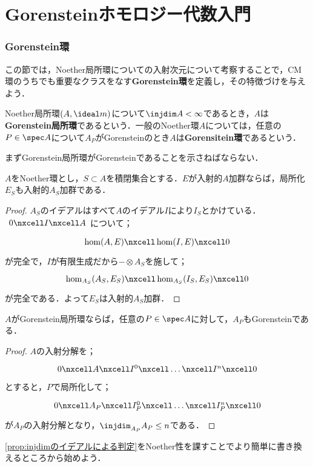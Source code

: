 \part[Introduction of Gorenstein Homological Algebra]{Gorensteinホモロジー代数入門}

\section{Gorenstein環}

この節では，Noether局所環についての入射次元について考察することで，CM環のうちでも重要なクラスをなす\textbf{Gorenstein環}を定義し，その特徴づけを与えよう．

\begin{defi}[Gorenstein環]
	Noether局所環$(A,\ideal m)$について$\injdim A<\infty$であるとき，$A$は\textbf{Gorenstein局所環}であるという．一般のNoether環$A$については，任意の$P\in\spec A$について$A_P$がGorensteinのとき$A$は\textbf{Gorensitein環}であるという．
\end{defi}

まずGorenstein局所環がGorensteinであることを示さねばならない．

\begin{lem}\label{lem:Noetherなら入射の局所化は入射}
	$A$をNoether環とし，$S\subset A$を積閉集合とする．$E$が入射的$A$加群ならば，局所化$E_S$も入射的$A_S$加群である．
\end{lem}

\begin{proof}
	$A_S$のイデアルはすべて$A$のイデアル$I$により$I_S$とかけている．$\begin{tikzcd}
	0\nxcell I\nxcell A
	\end{tikzcd}$について；
	\[\begin{tikzcd}
	\hom(A,E)\nxcell\hom(I,E)\nxcell0
	\end{tikzcd}\]
	が完全で，$I$が有限生成だから$-\otimes A_S$を施して；
	\[\begin{tikzcd}
	\hom_{A_S}(A_S,E_S)\nxcell\hom_{A_S}(I_S,E_S)\nxcell0
	\end{tikzcd}\]
	が完全である．よって$E_S$は入射的$A_S$加群．
\end{proof}

\begin{prop}
	$A$がGorenstein局所環ならば，任意の$P\in\spec A$に対して，$A_P$もGorensteinである．
\end{prop}

\begin{proof}
	$A$の入射分解を；
	\[\begin{tikzcd}
	0\nxcell A\nxcell I^0\nxcell\dots\nxcell I^n\nxcell0
	\end{tikzcd}\]
	とすると，$P$で局所化して；
	\[\begin{tikzcd}
	0\nxcell A_P\nxcell I^0_P\nxcell\dots\nxcell I^n_P\nxcell0
	\end{tikzcd}\]
	が$A_P$の入射分解となり，$\injdim_{A_P} A_P\leq n$である．
\end{proof}
\ref{prop:injdimのイデアルによる判定}をNoether性を課すことでより簡単に書き換えるところから始めよう．


